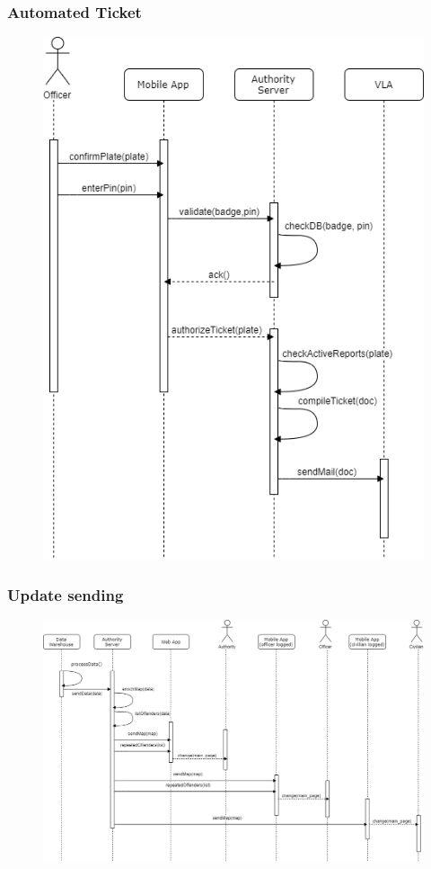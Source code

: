 \documentclass[12pt,a4paper]{article}
\begin{document}
		\subsubsection{Automated Ticket}
			\begin{figure}[H]
				\centering
				\includegraphics[width=.9\textwidth,height=.9\textheight,keepaspectratio]{Images/automated_ticket}
				\label{fig:automated_request_sequence}
			\end{figure}
\newpage
		\subsubsection{Update sending}
			\begin{figure}[H]
				\centering
				\includegraphics[width=.9\textwidth,height=.9\textheight,keepaspectratio]{Images/update_sending}
				\label{fig:sampling_request_sequence}
			\end{figure}
\end{document}
